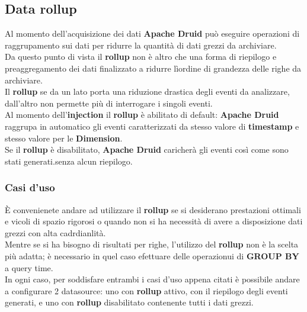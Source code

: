 \documentclass{article}
\begin{document}
\subsection{Data rollup}\label{subsection:rollup}
Al momento dell'acquisizione dei dati \textbf{Apache Druid} può eseguire operazioni di raggrupamento sui dati per ridurre la quantità di dati grezzi da archiviare. \\
Da questo punto di vista il \textbf{rollup} non è altro che una forma di riepilogo e preaggregamento dei dati finalizzato a ridurre lìordine di grandezza delle righe da archiviare.\\
Il \textbf{rollup} se da un lato porta una riduzione drastica degli eventi da analizzare, dall'altro non permette più di interrogare i singoli eventi.\\
Al momento dell'\textbf{injection} il \textbf{rollup} è abilitato di default: \textbf{Apache Druid} raggrupa in automatico gli eventi caratterizzati da stesso valore di \textbf{timestamp} e stesso valore per le \textbf{Dimension}. \\
Se il \textbf{rollup} è disabilitato, \textbf{Apache Druid} caricherà gli eventi così come sono stati generati.senza alcun riepilogo.
\subsubsection{Casi d'uso}
È convenienete andare ad utilizzare il \textbf{rollup} se si desiderano prestazioni ottimali e vicoli di spazio rigorosi o quando non si ha necessità di avere a disposizione dati grezzi con alta cadrdianlità. \\
Mentre se si ha bisogno di risultati per righe, l'utilizzo del \textbf{rollup} non è la scelta più adatta; è necessario in quel caso efettuare delle operazionui di \textbf{GROUP BY} a query time.
\\
In ogni caso, per soddisfare entrambi i casi d'uso appena citati è possibile andare a configurare 2 datasource: uno con \textbf{rollup} attivo, con il riepilogo degli eventi generati, e uno con \textbf{rollup} disabilitato contenente tutti i dati grezzi.
\end{document}
